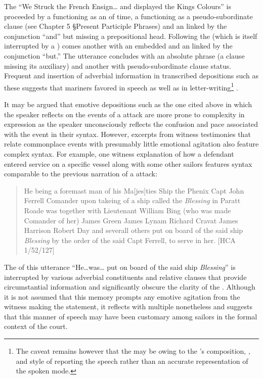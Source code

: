 The  “We Struck the French Ensign… and displayed the Kings Colours” is proceeded by a  functioning as an  of time, a  functioning as a pseudo-subordinate clause (see Chapter 5 §Present Participle Phrases) and an  linked by the conjunction “and” but missing a prepositional head. Following the  (which is itself interrupted by a ) comes another  with an embedded  and an  linked by the conjunction “but.” The utterance concludes with an absolute phrase (a clause missing its auxiliary) and another  with pseudo-subordinate clause status. Frequent  and insertion of adverbial information in transcribed depositions such as these suggests that mariners favored  in speech as well as in letter-writing\footnote{The caveat remains however that the  may be owing to the ’s composition, , and style of reporting the speech rather than an accurate representation of the spoken mode.} . 

It may be argued that emotive depositions such as the one cited above in which the speaker reflects on the events of a  attack are more prone to complexity in expression as the speaker unconsciously reflects the confusion and pace associated with the event in their syntax. However, excerpts from witness testimonies that relate commonplace events with presumably little emotional agitation also feature complex syntax. For example, one witness explanation of how a defendant entered service on a specific vessel along with some other sailors features syntax comparable to the previous narration of a  attack:

\begin{quotation}
He being a foremast man of his Ma[jes]ties Ship the Phenix Capt John Ferrell Comander upon takeing of a ship called the \textit{Blessing} in Paratt Roade was together with Lieutenant William Bing (who was made Comander of her) James Green James Lynam Richard Cravat James Harrison Robert Day and severall others put on board of the said ship \textit{Blessing} by the order of the said Capt Ferrell, to serve in her. [HCA 1/52/127]
\end{quotation}

The  of this utterance “He…was… put on board of the said ship \textit{Blessing}” is interrupted by various adverbial constituents and relative clauses that provide circumstantial information and significantly obscure the clarity of the . Although it is not assumed that this memory prompts any emotive agitation from the witness making the statement, it reflects  with multiple  nonetheless and suggests that this manner of speech may have been customary among sailors in the formal context of the court. 

